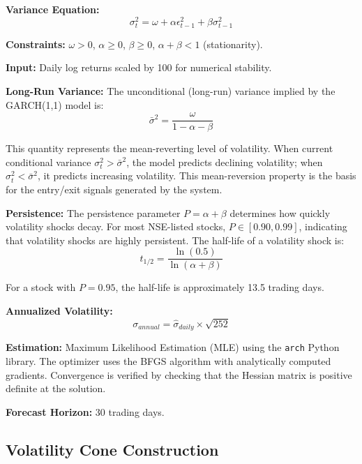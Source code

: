 \documentclass[12pt, a4paper, oneside]{report}
\begin{document}
\textbf{Variance Equation:}
\begin{equation}
    \sigma_t^2 = \omega + \alpha \epsilon_{t-1}^2 + \beta \sigma_{t-1}^2
\end{equation}

\textbf{Constraints:} $\omega > 0$, $\alpha \geq 0$, $\beta \geq 0$, $\alpha + \beta < 1$ (stationarity).

\textbf{Input:} Daily log returns scaled by 100 for numerical stability.

\textbf{Long-Run Variance:}
The unconditional (long-run) variance implied by the GARCH(1,1) model is:
\begin{equation}
    \bar{\sigma}^2 = \frac{\omega}{1 - \alpha - \beta}
\end{equation}

This quantity represents the mean-reverting level of volatility. When current conditional variance $\sigma_t^2 > \bar{\sigma}^2$, the model predicts declining volatility; when $\sigma_t^2 < \bar{\sigma}^2$, it predicts increasing volatility. This mean-reversion property is the basis for the entry/exit signals generated by the system.

\textbf{Persistence:}
The persistence parameter $P = \alpha + \beta$ determines how quickly volatility shocks decay. For most NSE-listed stocks, $P \in [0.90, 0.99]$, indicating that volatility shocks are highly persistent. The half-life of a volatility shock is:
\begin{equation}
    t_{1/2} = \frac{\ln(0.5)}{\ln(\alpha + \beta)}
\end{equation}

For a stock with $P = 0.95$, the half-life is approximately 13.5 trading days.

\textbf{Annualized Volatility:}
\begin{equation}
    \sigma_{annual} = \hat{\sigma}_{daily} \times \sqrt{252}
\end{equation}

\textbf{Estimation:} Maximum Likelihood Estimation (MLE) using the \texttt{arch} Python library. The optimizer uses the BFGS algorithm with analytically computed gradients. Convergence is verified by checking that the Hessian matrix is positive definite at the solution.

\textbf{Forecast Horizon:} 30 trading days.

\subsection{Volatility Cone Construction}
\end{document}
